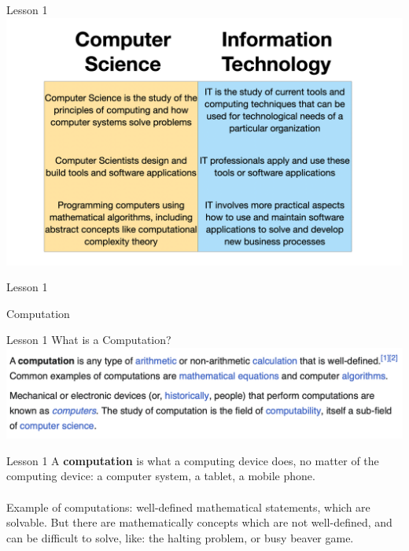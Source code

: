 \documentclass[aspectratio=1610]{beamer}
\begin{document}
\begin{frame}{Lesson 1}{}
\includegraphics[scale=0.158]{Images/itvscs_10.png}
\end{frame}

\begin{frame}{Lesson 1}{}
\begin{center}
\Huge Computation
\end{center}
\end{frame}

\begin{frame}{Lesson 1}{}
{\Huge{What is a Computation?}}
\includegraphics[scale=0.58]{Images/computation.png}
\end{frame}




\begin{frame}{Lesson 1}{}
\Large
A \textbf{computation} is what a computing device does, no matter of the computing device: a computer system, a tablet, a mobile phone.\\~\\

Example of computations: well-defined mathematical statements, which are solvable. But there are mathematically concepts which are not well-defined, and can be difficult to solve, like: the halting problem, or busy beaver game.

\end{frame}
\end{document}
